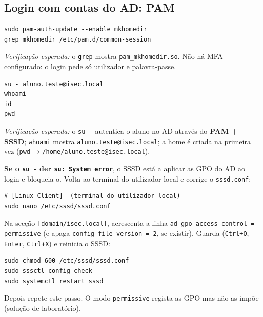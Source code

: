 
\subsection[Login com contas do AD: PAM]{Login com contas do AD: PAM}



\begin{lstlisting}[style=bashstyle]
sudo pam-auth-update --enable mkhomedir
grep mkhomedir /etc/pam.d/common-session
\end{lstlisting}

\emph{Verificação esperada:} o \texttt{grep} mostra \texttt{pam\_mkhomedir.so}. Não há MFA configurado: o login pede só utilizador e palavra-passe.


\begin{lstlisting}[style=bashstyle]
su - aluno.teste@isec.local
whoami
id
pwd
\end{lstlisting}

\emph{Verificação esperada:} o \texttt{su -} autentica o aluno no AD através do \textbf{PAM + SSSD}; \texttt{whoami} mostra \texttt{aluno.teste@isec.local}; a home é criada na primeira vez (\texttt{pwd} → \texttt{/\allowbreak{}home/\allowbreak{}aluno.teste@isec.local}).

\begin{importantebox}[title={Importante}]
\textbf{Se o \texttt{su -} der \texttt{su: System error}}, o SSSD está a aplicar as GPO do AD ao login e bloqueia-o. Volta ao terminal do utilizador local e corrige o \texttt{sssd.conf}:

\begin{lstlisting}[style=bashstyle]
# [Linux Client]  (terminal do utilizador local)
sudo nano /etc/sssd/sssd.conf
\end{lstlisting}

Na secção \texttt{[domain/\allowbreak{}isec.local]}, acrescenta a linha \texttt{ad\_gpo\_access\_control = permissive} (e apaga \texttt{config\_file\_version = 2}, se existir). Guarda (\texttt{Ctrl+O}, \texttt{Enter}, \texttt{Ctrl+X}) e reinicia o SSSD:

\begin{lstlisting}[style=bashstyle]
sudo chmod 600 /etc/sssd/sssd.conf
sudo sssctl config-check
sudo systemctl restart sssd
\end{lstlisting}

Depois repete este passo. O modo \texttt{permissive} regista as GPO mas não as impõe (solução de laboratório).
\end{importantebox}

